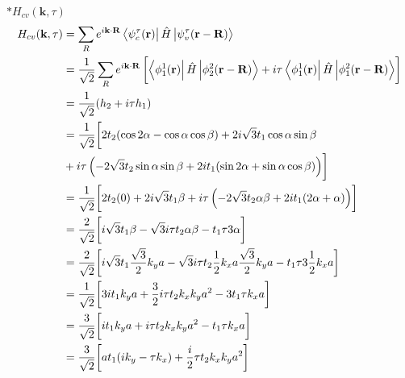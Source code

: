 \documentclass{report}
\newcommand{\f}[2]{\dfrac{#1}{#2}}
\begin{document}
$\ast H_{cv}(\mathbf{k},\tau)$
\begin{align*}
	 H_{cv}(\mathbf{k},\tau) 
	 & = \sum_{R} e^{i\mathbf{k\cdot R}}\bra{\psi_{c}^{\mathfrak{\tau}}(\mathbf{r})}\hat{H}\ket{\mathcal{\psi}_{v}^{\tau}(\mathbf{r - R})}\\
	 & = \f{1}{\sqrt{2}}\sum_{R} e^{i\mathbf{k\cdot R}}\left[ \bra{\phi^1_1(\mathbf{r})} \hat{H} \ket{\phi^2_2(\mathbf{r-R})} + i\tau\bra{\phi^1_1(\mathbf{r})}\hat{H}\ket{\phi^2_1(\mathbf{r-R})} \right] \\
	 & = \f{1}{\sqrt{2}} (h_2 + i\tau h_1) \\ 
	 & = \frac{1}{\sqrt{2}} \biggl[ 2t_2 (\cos 2\alpha -\cos\alpha\cos\beta ) + 2i\sqrt{3}t_1\cos\alpha\sin\beta  \\
	 & + i\tau \left(-2\sqrt{3} t_2 \sin\alpha \sin\beta + 2i t_1(\sin2\alpha + \sin\alpha \cos\beta )\right) \biggr] \\
	 & = \frac{1}{\sqrt{2}} \biggl[ 2t_2 (0) + 2i\sqrt{3}t_1\beta + i\tau \left(-2\sqrt{3} t_2 \alpha \beta + 2i t_1(2\alpha + \alpha )\right) \biggr] \\
	 & = \f{2}{\sqrt{2}} \biggl[ i\sqrt{3}t_1\beta - \sqrt{3}i\tau t_2\alpha\beta - t_1 \tau 3\alpha  \biggr]\\
	 & = \f{2}{\sqrt{2}} \biggl[ i\sqrt{3}t_1 \dfrac{\sqrt{3}}{2} k_y a - \sqrt{3}i\tau t_2 \dfrac{1}{2} k_x a \dfrac{\sqrt{3}}{2} k_y a - t_1 \tau 3 \dfrac{1}{2} k_x a \biggr]\\
	 & = \f{1}{\sqrt{2}} \biggl[ 3i t_1 k_y a + \f{3}{2} i\tau t_2 k_x k_y a^2  - 3 t_1 \tau k_x a\biggr] \\ 
	 & = \f{3}{\sqrt{2}} \biggl[ i t_1 k_y a + i\tau t_2 k_x k_y a^2 - t_1 \tau k_x a\biggr] \\ 
	 & = \f{3}{\sqrt{2}} \biggl[ a t_1 (ik_y - \tau k_x) + \f{i}{2}\tau t_2 k_x k_y a^2  \biggr] \\ 
\end{align*}
\end{document}
